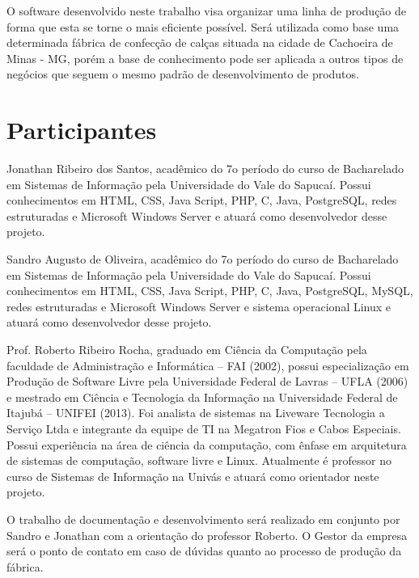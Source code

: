 \par O software desenvolvido neste trabalho visa organizar uma linha de produção
de forma que esta se torne o mais eficiente possível. Será utilizada como
base uma determinada fábrica de confecção de calças situada na cidade de
Cachoeira de Minas - MG, porém a base de conhecimento pode ser aplicada a outros
tipos de negócios que seguem o mesmo padrão de desenvolvimento de produtos.


\section{Participantes}

\par Jonathan Ribeiro dos Santos, acadêmico do 7o período do curso de Bacharelado em
Sistemas de Informação pela Universidade do Vale do Sapucaí. Possui
conhecimentos em HTML, CSS, Java Script, PHP, C, Java, PostgreSQL, redes
estruturadas e Microsoft Windows Server e atuará como desenvolvedor desse
projeto.

\par Sandro Augusto de Oliveira, acadêmico do 7o período do curso de Bacharelado
em Sistemas de Informação pela Universidade do Vale do Sapucaí. Possui
conhecimentos em HTML, CSS, Java Script, PHP, C, Java, PostgreSQL, MySQL, redes
estruturadas e Microsoft Windows Server e sistema operacional Linux e atuará
como desenvolvedor desse projeto.

\par Prof. Roberto Ribeiro Rocha, graduado em Ciência da Computação pela
faculdade de Administração e Informática – FAI (2002), possui especialização
em Produção de Software Livre pela Universidade Federal de Lavras – UFLA (2006)
e mestrado em Ciência e Tecnologia da Informação na Universidade Federal de Itajubá – UNIFEI (2013).
Foi analista de sistemas na Liveware Tecnologia a Serviço Ltda e integrante da equipe de TI na Megatron
Fios e Cabos Especiais. Possui experiência na área de ciência da computação, com ênfase em arquitetura de
sistemas de computação, software livre e Linux. Atualmente é professor no curso de Sistemas de Informação 
na Univás e atuará como orientador neste projeto.


\par O trabalho de documentação e desenvolvimento será realizado em conjunto por
Sandro e Jonathan com a orientação do professor Roberto. O Gestor da empresa
será o ponto de contato em caso de dúvidas quanto ao processo de produção da
fábrica.


